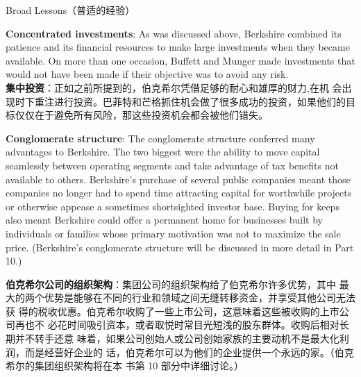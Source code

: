 \begin{section}{Broad Lessons（普适的经验）}
\begin{verseparallel}
  {
    \textbf{Concentrated investments}: As was discussed above, Berkshire
    combined its patience and its financial resources to make large investments
    when they became available. On more than one occasion, Buffett and Munger
    made investments that would not have been made if their objective was to
    avoid any risk. \\
  }
  {
    \textbf{集中投资}：正如之前所提到的，伯克希尔凭借足够的耐心和雄厚的财力,在机
    会出现时下重注进行投资。巴菲特和芒格抓住机会做了很多成功的投资，如果他们的目
    标仅仅在于避免所有风险，那这些投资机会都会被他们错失。
  }
\end{verseparallel}

\begin{verseparallel}
  {

    \textbf{Conglomerate structure}: The conglomerate structure conferred many
    advantages to Berkshire. The two biggest were the ability to move capital
    seamlessly between operating segments and take advantage of tax benefits not
    available to others. Berkshire's purchase of several public companies meant
    those companies no longer had to spend time attracting capital for
    worthwhile projects or otherwise appease a sometimes shortsighted investor
    base. Buying for keeps also meant Berkshire could offer a permanent home for
    businesses built by individuals or families whose primary motivation was not
    to maximize the sale price. (Berkshire's conglomerate structure will be
    discussed in more detail in Part 10.) \\
  }
  {

    \textbf{伯克希尔公司的组织架构}：集团公司的组织架构给了伯克希尔许多优势，其中
    最大的两个优势是能够在不同的行业和领域之间无缝转移资金，并享受其他公司无法获
    得的税收优惠。伯克希尔收购了一些上市公司，这意味着这些被收购的上市公司再也不
    必花时间吸引资本，或者取悦时常目光短浅的股东群体。收购后相对长期并不转手还意
    味着，如果公司创始人或公司创始家族的主要动机不是最大化利润，而是经营好企业的
    话，伯克希尔可以为他们的企业提供一个永远的家。（伯克希尔的集团组织架构将在本
    书第 10 部分中详细讨论。）

  }
\end{verseparallel}


\end{section}
